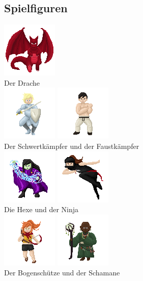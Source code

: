 \documentclass[10pt,a4paper,notitlepage]{scrreprt}
\begin{document}
			\subsection{Spielfiguren}
				\begin{center}
					\includegraphics[scale=2]{Dragon}\\
					Der Drache\\
						
					\includegraphics[scale=2]{Knight}
					\includegraphics[scale=2]{Fighter}\\
					Der Schwertkämpfer und der Faustkämpfer\\
					
					\includegraphics[scale=2]{Witch}
					\includegraphics[scale=3.5]{Ninja}\\
					Die Hexe und der Ninja\\
					
					\includegraphics[scale=2]{Archer}
					\includegraphics[scale=2]{Shaman}\\
					Der Bogenschütze und der Schamane\\
				\end{center}
			
\end{document}

